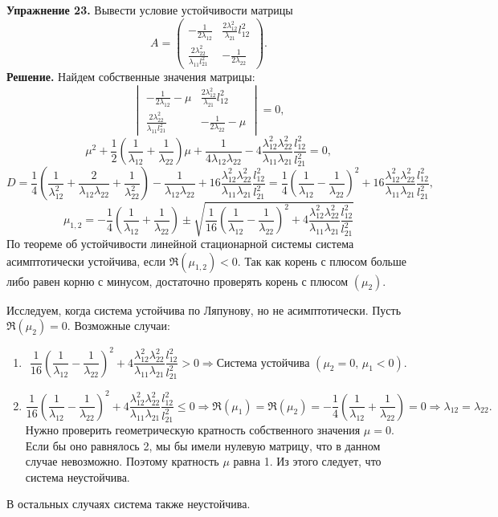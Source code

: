 \documentclass{article}
\begin{document}
	
\noindent\textbf{Упражнение 23.}
	Вывести условие устойчивости матрицы
	\[A = \begin{pmatrix} -\frac{1}{2\lambda_{12}} & \frac{2\lambda^2_{12}}{\lambda_{21}}l^2_{12} \\ \frac{2\lambda^2_{22}}{\lambda_{11}l^2_{21}} & -\frac{1}{2\lambda_{22}} \end{pmatrix}. \]
\noindent\textbf{Решение.}
Найдем собственные значения матрицы:
\[\begin{vmatrix} -\frac{1}{2\lambda_{12}} - \mu & \frac{2\lambda^2_{12}}{\lambda_{21}}l^2_{12} \\ \frac{2\lambda^2_{22}}{\lambda_{11}l^2_{21}} & -\frac{1}{2\lambda_{22}} - \mu \end{vmatrix} = 0,\]
\[\mu^2 +\frac{1}{2}\left(\frac{1}{\lambda_{12}} + \frac{1}{\lambda_{22}}\right)\mu + \frac{1}{4\lambda_{12}\lambda_{22}} - 4\frac{\lambda_{12}^2\lambda_{22}^2}{\lambda_{11}\lambda_{21}}\frac{l_{12}^2}{l_{21}^2} = 0,\]
\[D = \frac{1}{4}\left(\frac{1}{\lambda_{12}^2} + \frac{2}{\lambda_{12}\lambda_{22}} + \frac{1}{\lambda_{22}^2}\right) - \frac{1}{\lambda_{12}\lambda_{22}} + 16\frac{\lambda_{12}^2\lambda_{22}^2}{\lambda_{11}\lambda_{21}}\frac{l_{12}^2}{l_{21}^2} = \frac{1}{4}\left(\frac{1}{\lambda_{12}} - \frac{1}{\lambda_{22}}\right)^2 + 16\frac{\lambda_{12}^2\lambda_{22}^2}{\lambda_{11}\lambda_{21}}\frac{l_{12}^2}{l_{21}^2},\]
\[\mu_{1, 2} = -\frac{1}{4}\left(\frac{1}{\lambda_{12}} + \frac{1}{\lambda_{22}}\right) \pm \sqrt{\frac{1}{16}\left(\frac{1}{\lambda_{12}} - \frac{1}{\lambda_{22}}\right)^2 + 4\frac{\lambda_{12}^2\lambda_{22}^2}{\lambda_{11}\lambda_{21}}\frac{l_{12}^2}{l_{21}^2}}\]
По теореме об устойчивости линейной стационарной системы система асимптотически устойчива, если \(\Re (\mu_{1, 2})  < 0\). Так как корень с плюсом больше либо равен корню с минусом, достаточно проверять корень с плюсом \((\mu_2)\).

Исследуем, когда система устойчива по Ляпунову, но не асимптотически. Пусть \(\Re (\mu_2) = 0\). Возможные случаи:
\begin{enumerate}
	\item \[\frac{1}{16}\left(\frac{1}{\lambda_{12}} - \frac{1}{\lambda_{22}}\right)^2 + 4\frac{\lambda_{12}^2\lambda_{22}^2}{\lambda_{11}\lambda_{21}}\frac{l_{12}^2}{l_{21}^2} > 0 \Rightarrow 
	\text{Система устойчива }  (\mu_2 = 0,\, \mu_1 < 0).\]
	\item \[\frac{1}{16}\left(\frac{1}{\lambda_{12}} - \frac{1}{\lambda_{22}}\right)^2 + 4\frac{\lambda_{12}^2\lambda_{22}^2}{\lambda_{11}\lambda_{21}}\frac{l_{12}^2}{l_{21}^2} \le 0 \Rightarrow \Re (\mu_1) = \Re (\mu_2) = -\frac{1}{4}\left(\frac{1}{\lambda_{12}} + \frac{1}{\lambda_{22}}\right) = 0 \Rightarrow \lambda_{12} = \lambda_{22}.\]
	Нужно проверить геометрическую кратность собственного значения \(\mu = 0\). Если бы оно равнялось 2, мы бы имели нулевую матрицу, что в данном случае невозможно. Поэтому кратность \(\mu\) равна 1. Из этого следует, что система неустойчива.
\end{enumerate} 
В остальных случаях система также неустойчива.
\end{document}
